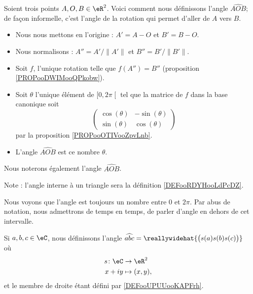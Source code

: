 \begin{definition}      \label{DEFooUPUUooKAPFrh}
	Soient trois points \( A,O,B\in \eR^2\). Voici comment nous définissons l'angle \( \widehat{AOB}\); de façon informelle, c'est l'angle de la rotation qui permet d'aller de \( A\) vers \( B\).
	\begin{itemize}
		\item Nous nous mettons en l'origine : \( A'=A-O\) et \( B'=B-O\).
		\item Nous normalisons : \( A''=A'/\| A' \|\) et \( B''=B'/\| B' \|\).
		\item Soit \( f\), l'unique rotation telle que \( f(A'')=B''\) (proposition \ref{PROPooDWIMooQPkobw}).
		\item Soit \( \theta\) l'unique élément de \( \mathopen[ 0 , 2\pi \mathclose[\) tel que la matrice de \( f\) dans la base canonique soit
		      \begin{equation}
			      \begin{pmatrix}
				      \cos(\theta) & -\sin(\theta) \\
				      \sin(\theta) & \cos(\theta)
			      \end{pmatrix}
		      \end{equation}
		      par la proposition \ref{PROPooOTIVooZpvLnb}.
		\item L'angle \( \widehat{AOB}\) est ce nombre \( \theta\).
	\end{itemize}
	Nous noterons également l'angle \( \widehat{AOB}\).

	Note : l'angle interne à un triangle sera la définition \ref{DEFooRDYHooLdPcDZ}.
\end{definition}



Nous voyons que l'angle est toujours un nombre entre \( 0\) et \( 2\pi\). Par abus de notation, nous admettrons de temps en temps, de parler d'angle en dehors de cet intervalle.

\begin{definition}     \label{DEFooMAKWooGRutOk}
	Si \( a,b,c\in \eC\), nous définissons l'angle \( \widehat{abc}=\reallywidehat{\big( s(a)s(b)s(c) \big)}\) où
	\begin{equation}
		\begin{aligned}
			s\colon \eC & \to \eR^2      \\
			x+iy        & \mapsto (x,y),
		\end{aligned}
	\end{equation}
	et le membre de droite étant défini par \ref{DEFooUPUUooKAPFrh}.
\end{definition}

